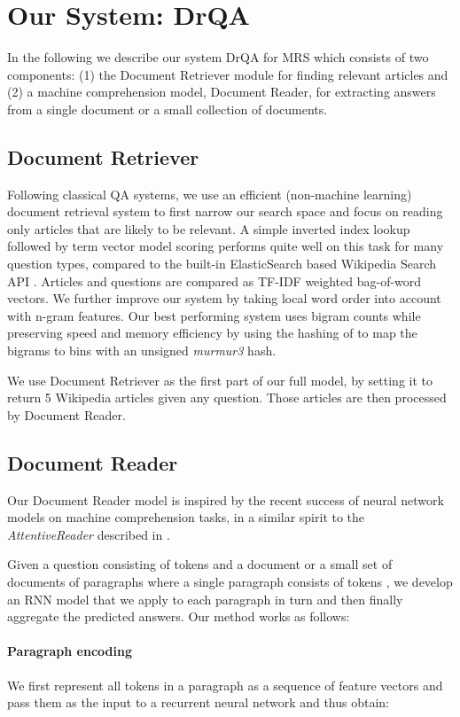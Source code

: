 \documentclass[11pt,a4paper]{article}
\newcommand\us{DrQA\xspace}
\newcommand\usr{Document Retriever\xspace}
\newcommand\usp{Document Reader\xspace}
\begin{document}
\section{Our System: \us} \label{sec:model}

In the following we describe our system \us for MRS which consists of two components: (1) the Document Retriever module for finding relevant articles and (2) a machine comprehension model, \usp, for extracting answers from a single document or a small collection of documents.
\subsection{\usr} \label{sec:irmodel}
Following classical QA systems, we use an efficient (non-machine learning) document retrieval system to first narrow our search space and focus on reading only articles that are likely to be relevant. A simple inverted index lookup followed by term vector model scoring performs quite well on this task for many question types, compared to the built-in ElasticSearch based Wikipedia Search API \cite{gormley2015elasticsearch}. Articles and questions are compared as TF-IDF weighted bag-of-word vectors.
We further improve our system by taking local word order into account with n-gram features. Our best performing system uses bigram counts while preserving speed and memory efficiency by using the hashing of \cite{weinberger2009feature} to map the bigrams to  bins with an unsigned \emph{murmur3} hash.

We use \usr as the first part of our full model, by setting it to return 5 Wikipedia articles given any question. Those articles are then processed by \usp.


\subsection{Document Reader}
Our \usp model is inspired by the recent success of neural network models on machine comprehension tasks, in a similar spirit to the \emph{AttentiveReader} described in \cite{nips2015hermann,chen2016thorough}.



Given a question  consisting of  tokens  and a
document or a small set of documents of  paragraphs where a single paragraph  consists of  tokens ,  we develop an RNN model that we apply to each paragraph in turn and then finally aggregate the predicted answers. Our method works as follows:

\paragraph{\textbf{Paragraph encoding}} We first represent all tokens  in a paragraph 
as a sequence of feature vectors  and pass them as the input to a recurrent neural network and thus obtain:
\end{document}
